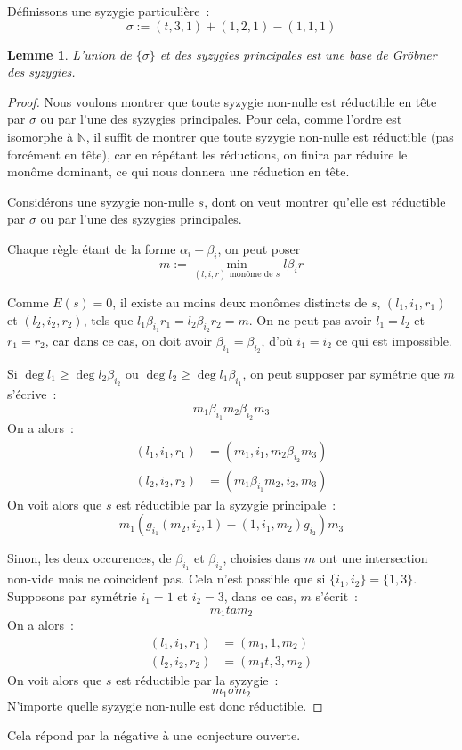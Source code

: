 \documentclass{article}
\newtheorem*{lem}{Lemme}
\newcommand{\N}{\mathbb{N}}
\begin{document}
Définissons une syzygie particulière~:
$$\sigma := (t, 3, 1) + (1, 2, 1) - (1, 1, 1)$$

\begin{lem}
	L'union de $\{\sigma\}$ et des syzygies principales est une base de Gröbner des syzygies.
\end{lem}
\begin{proof}
	Nous voulons montrer que toute syzygie non-nulle est réductible en tête par $\sigma$ ou par l'une des syzygies principales.
	Pour cela, comme l'ordre est isomorphe à $\N$, il suffit de montrer que toute syzygie non-nulle est réductible (pas forcément en tête), car en répétant les réductions, on finira par réduire le monôme dominant, ce qui nous donnera une réduction en tête.
	
	Considérons une syzygie non-nulle $s$, dont on veut montrer qu'elle est réductible par $\sigma$ ou par l'une des syzygies principales.
	
	Chaque règle étant de la forme $\alpha_i - \beta_i$, on peut poser 
	$$m := \min_{(l, i, r) \mbox{ monôme de } s} l \beta_i r$$
	
	Comme $E(s) = 0$, il existe au moins deux monômes distincts de $s$, $(l_1, i_1, r_1)$ et $(l_2, i_2, r_2)$, tels que $l_1 \beta_{i_1} r_1 = l_2 \beta_{i_2} r_2 = m$.
	On ne peut pas avoir $l_1 = l_2$ et $r_1 = r_2$, car dans ce cas, on doit avoir $\beta_{i_1} = \beta_{i_2}$, d'où $i_1 = i_2$ ce qui est impossible.
	
	Si $\deg{l_1} \geq \deg{l_2 \beta_{i_2}}$ ou $\deg{l_2} \geq \deg{l_1 \beta_{i_1}}$, on peut supposer par symétrie que $m$ s'écrive~:
	$$m_1 \beta_{i_1} m_2 \beta_{i_2} m_3$$
	On a alors~:
	\begin{align*}
		(l_1, i_1, r_1) &= (m_1, i_1, m_2 \beta_{i_2} m_3) \\
		(l_2, i_2, r_2) &= (m_1 \beta_{i_1} m_2, i_2, m_3)
	\end{align*}
	On voit alors que $s$ est réductible par la syzygie principale~:
	$$m_1 (g_{i_1} (m_2, i_2, 1) - (1, i_1, m_2) g_{i_2}) m_3$$
	
	Sinon, les deux occurences, de $\beta_{i_1}$ et $\beta_{i_2}$, choisies dans $m$ ont une intersection non-vide mais ne coincident pas.
	Cela n'est possible que si $\{i_1, i_2\} = \{1, 3\}$.
	Supposons par symétrie $i_1 = 1$ et $i_2 = 3$, dans ce cas, $m$ s'écrit~:
	$$m_1 ta m_2$$
	On a alors~:
	\begin{align*}
		(l_1, i_1, r_1) &= (m_1, 1, m_2) \\
		(l_2, i_2, r_2) &= (m_1 t, 3, m_2)
	\end{align*}
	On voit alors que $s$ est réductible par la syzygie~:
	$$m_1 \sigma m_2$$
	N'importe quelle syzygie non-nulle est donc réductible.
\end{proof}
Cela répond par la négative à une conjecture ouverte.
\end{document}
